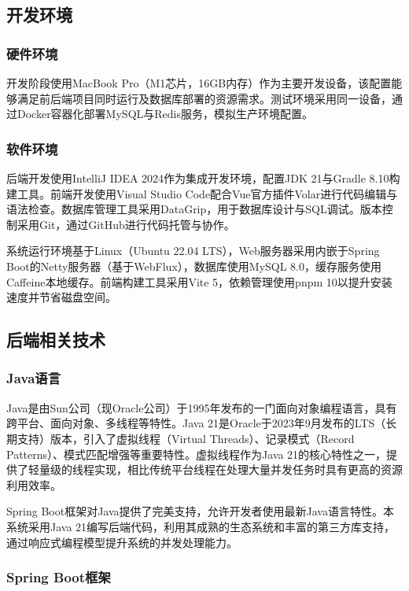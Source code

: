 \documentclass[UTF8,AutoFakeBold=1,AutoFakeSlant,zihao=-4]{SCAU}
\begin{document}
\subsection{开发环境}

\subsubsection{硬件环境}

开发阶段使用MacBook Pro（M1芯片，16GB内存）作为主要开发设备，该配置能够满足前后端项目同时运行及数据库部署的资源需求。测试环境采用同一设备，通过Docker容器化部署MySQL与Redis服务，模拟生产环境配置。

\subsubsection{软件环境}

后端开发使用IntelliJ IDEA 2024作为集成开发环境，配置JDK 21与Gradle 8.10构建工具。前端开发使用Visual Studio Code配合Vue官方插件Volar进行代码编辑与语法检查。数据库管理工具采用DataGrip，用于数据库设计与SQL调试。版本控制采用Git，通过GitHub进行代码托管与协作。

系统运行环境基于Linux（Ubuntu 22.04 LTS），Web服务器采用内嵌于Spring Boot的Netty服务器（基于WebFlux），数据库使用MySQL 8.0，缓存服务使用Caffeine本地缓存。前端构建工具采用Vite 5，依赖管理使用pnpm 10以提升安装速度并节省磁盘空间。

\subsection{后端相关技术}

\subsubsection{Java语言}

Java是由Sun公司（现Oracle公司）于1995年发布的一门面向对象编程语言，具有跨平台、面向对象、多线程等特性。Java 21是Oracle于2023年9月发布的LTS（长期支持）版本，引入了虚拟线程（Virtual Threads）、记录模式（Record Patterns）、模式匹配增强等重要特性。虚拟线程作为Java 21的核心特性之一，提供了轻量级的线程实现，相比传统平台线程在处理大量并发任务时具有更高的资源利用效率。

Spring Boot框架对Java提供了完美支持，允许开发者使用最新Java语言特性。本系统采用Java 21编写后端代码，利用其成熟的生态系统和丰富的第三方库支持，通过响应式编程模型提升系统的并发处理能力。

\subsubsection{Spring Boot框架}
\end{document}
